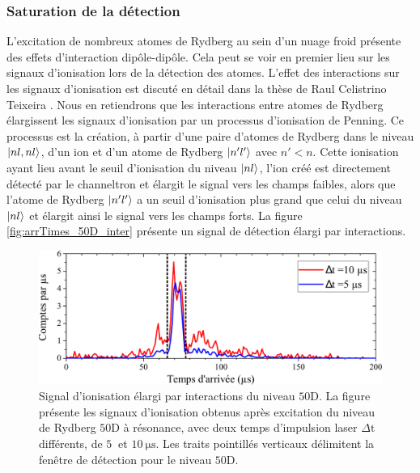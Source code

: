 		\subsubsection*{Saturation de la détection}
\noindent L'excitation de nombreux atomes de Rydberg au sein d'un nuage froid présente des effets d'interaction dipôle-dipôle.
Cela peut se voir en premier lieu sur les signaux d'ionisation lors de la détection des atomes.
L'effet des interactions sur les signaux d'ionisation est discuté en détail dans la thèse de Raul Celistrino Teixeira \cite{PHD_CELISTRINO}.
Nous en retiendrons que les interactions entre atomes de Rydberg élargissent les signaux d'ionisation par un processus d'ionisation de Penning.
Ce processus est la création, à partir d'une paire d'atomes de Rydberg dans le niveau $\ket{nl,nl}$, d'un ion et d'un atome de Rydberg $\ket{n'l'}$ avec $n'<n$.
Cette ionisation ayant lieu avant le seuil d'ionisation du niveau $\ket{nl}$, l'ion créé est directement détecté par le channeltron et élargit le signal vers les champs faibles, alors que l'atome de Rydberg $\ket{n'l'}$ a un seuil d'ionisation plus grand que celui du niveau $\ket{nl}$ et élargit ainsi le signal vers les champs forts.
La figure \eqref{fig:arrTimes_50D_inter} présente un signal de détection élargi par interactions.
%
\begin{figure}[!h]
\centering
\includegraphics[width=\linewidth]{figures/circulars/arrTimes_50D_inter}
\caption[Signal d'ionisation élargi par interactions du niveau $\mathrm{50D}$]{
Signal d'ionisation élargi par interactions du niveau $\mathrm{50D}$.
La figure présente les signaux d'ionisation obtenus après excitation du niveau de Rydberg $\mathrm{50D}$ à résonance, avec deux temps d'impulsion laser $\Delta \mathrm{t}$ différents, de $\SI{5}{}$ et $\SI{10}{\us}$.
Les traits pointillés verticaux délimitent la fenêtre de détection pour le niveau $\mathrm{50D}$.
}
\label{fig:arrTimes_50D_inter}
\end{figure}
